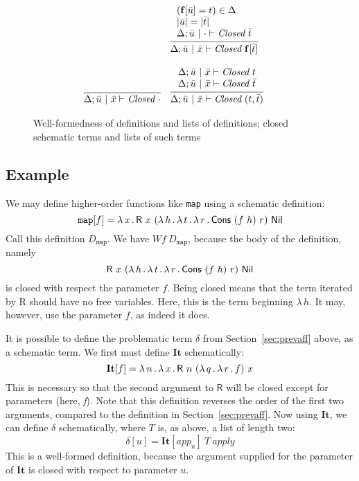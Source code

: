 \documentclass{article}
\begin{document}
\begin{figure}
\[\begin{array}{lll}
   &\infer{\Delta;\bar{u}\ |\ \bar{x}\vdash\textit{Closed}\ \mathbf{f}[\bar{t}]}
        {\begin{array}{l}
             (\mathbf{f}[\bar{u}] = t) \in \Delta \\
            |\bar{u}| = |\bar{t}| \\
           \Delta;\bar{u}\ |\ \cdot \vdash \textit{Closed}\ \bar{t}
         \end{array}} 
\\ \\
\infer{\Delta;\bar{u}\ |\ \bar{x}\vdash \textit{Closed}\ \cdot}{\ }&
\infer{\Delta;\bar{u}\ |\ \bar{x}\vdash \textit{Closed}\ (t,\bar{t})}
  {\begin{array}{l}
    \Delta;\bar{u}\ |\ \bar{x}\vdash \textit{Closed}\ t \\
    \Delta;\bar{u}\ |\ \bar{x}\vdash \textit{Closed}\ \bar{t}
\end{array}}&\ 
   \end{array}
  \]
  \caption{Well-formedness of definitions and lists of definitions; closed schematic terms and lists of such terms}
\label{fig:sarwf}
\end{figure}

\subsection{Example}

We may define higher-order functions like \texttt{map} using a schematic definition:
\[
\texttt{map}[f] = \lam{x}{\mathsf{R}\ x\ (\lam{h}{\lam{t}{\lam{r}{\mathsf{Cons}\ (f\ h)\ r}}})\ \mathsf{Nil}}
\]
\noindent Call this definition $D_{\texttt{map}}$.  We have $\textit{Wf}\ D_{\texttt{map}}$, because the
body of the definition, namely
\[
\mathsf{R}\ x\ (\lam{h}{\lam{t}{\lam{r}{\mathsf{Cons}\ (f\ h)\ r}}})\ \mathsf{Nil}
\]
\noindent is closed with respect the parameter $f$.  Being closed
means that the term iterated by \textsf{R} should have no free
variables.  Here, this is the term beginning $\lambda\, h$.  It may,
however, use the parameter $f$, as indeed it does.

It is possible to define the problematic term $\delta$ from
Section~\ref{sec:prevaff} above, as a schematic term.  We first
must define $\mathbf{It}$ schematically:
\[
\mathbf{It}[f] = \lambda\, n\, .\, \lambda\, x\, .\, \mathsf{R}\ n\ (\lambda\, q\, .\, \lambda\, r\, .\, f)\ x
\]
\noindent This is necessary so that the second argument to $\mathsf{R}$ will
be closed except for parameters (here, \textit{f}).  Note that this definition
reverses the order of the first two arguments, compared to the definition
in Section~\ref{sec:prevaff}.  Now using $\mathbf{It}$,
we can define $\delta$ schematically, where $T$ is, as above, a list of length two:
\[
\delta[u] = \mathbf{It}[\textit{app}_u]\ T\ \textit{apply}
\]
\noindent This is a well-formed definition, because the argument supplied for
the parameter of $\mathbf{It}$ is closed with respect to parameter $u$.
\end{document}

